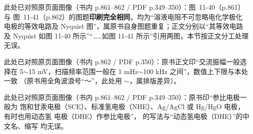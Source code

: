 此处已对照原页面图像（书内 p.861--862 / PDF p.349--350）：图~11-40（p.861）与
图~11-41（p.862）的图题\textbf{印刷完全相同}，均为“溶液电阻不可忽略电化学极化
电极的等效电路及 Nyquist 图”，属原书自身图题重复；正文分别以“其等效电路及
Nyquist 如图 11-40 所示”“……如图 11-41 所示”引用两图，本节按正文分工处理无误。

此处已对照原页面图像（书内 p.862 / PDF p.350）：原书正文印“交流振幅一般选择在
5$\sim$15 mV，扫描频率范围一般在 1 mHz$\sim$100 kHz 之间”，数值上下限与本处一致
（原书用全角波浪号“～”，此处用 $\sim$，属排版差异）。

此处已对照原页面图像（书内 p.861--862 / PDF p.349--350）：原书印“参比电极一般为
饱和甘汞电极（SCE）、标准氢电极（NHE）、Ag/AgCl 或 Hg/HgO 电极，有时也用动态氢
电极（DHE）作参比电极”， 的写法与“动态氢电极（DHE）”的中文名、缩写
均无误。

